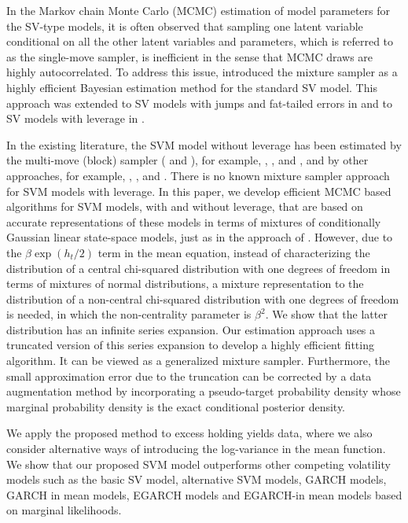 In the Markov chain Monte Carlo (MCMC) estimation of model parameters for the SV-type models, it is often observed that sampling one latent variable conditional on all the other latent variables and parameters, which is referred to as the single-move sampler, is inefficient in the sense that MCMC draws are highly autocorrelated. To address this issue, \cite{KimShephardChib(98)} introduced the mixture sampler as a highly efficient Bayesian estimation method for the standard SV model. This approach was extended to SV models with jumps and fat-tailed errors in \cite{ChibNardariShephard(02)} and to SV models with leverage in \cite{OmoriChibShephardNakajima(07)}.

In the existing literature, the SVM model without leverage has been estimated by the multi-move (block) sampler (\cite{ShephardPitt(97)} and \cite{OmoriWatanabe(08)}), for example, \cite{AbantoMigonLachos(11)}, \cite{AbantoMigonLachos(12)}, and \cite{LeaoAbantoChen(17)}, and by other approaches, for example, \cite{Chan(17)}, \cite{AbantoRodriguezGarrafa(21)}, and \cite{AbantoRodriguezHernan(23)}. There is no known mixture sampler approach for SVM models with leverage.  In this paper, we develop efficient MCMC based algorithms for SVM models, with and without leverage, that are based on accurate representations of these models in terms of mixtures of conditionally Gaussian linear state-space models, just as in the approach of \cite{KimShephardChib(98)}. However, due to the $\beta\exp(h_t/2)$ term in the mean equation, instead of characterizing the distribution of a central chi-squared distribution with one degrees of freedom in terms of mixtures of normal distributions, a mixture representation to the distribution of a non-central chi-squared distribution with one degrees of freedom is needed, in which the non-centrality parameter is $\beta^2$. We show that the latter distribution has an infinite series expansion. Our estimation approach uses a truncated version of this series expansion to develop a highly efficient fitting algorithm. It can be viewed as a generalized mixture sampler. Furthermore, the small approximation error due to the truncation can be corrected by a data augmentation method by incorporating a pseudo-target probability density whose marginal probability density is the exact conditional posterior density. 

We apply the proposed method to excess holding yields data, where we also consider alternative ways of introducing the log-variance in the mean function. We show that our proposed SVM model outperforms other competing volatility models such as the basic SV model, alternative SVM models, GARCH models, GARCH in mean models, EGARCH models and EGARCH-in mean models based on marginal likelihoods.

